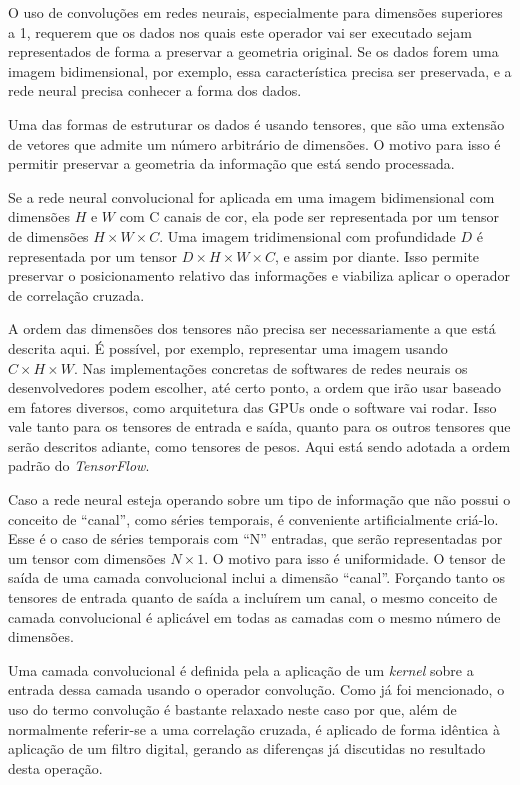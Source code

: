 O uso de convoluções em redes neurais, especialmente para dimensões superiores
a 1, requerem que os dados nos quais este operador vai ser executado sejam
representados de forma a preservar a geometria original. Se os dados forem uma
imagem bidimensional, por exemplo, essa característica precisa ser preservada,
e a rede neural precisa conhecer a forma dos dados.

Uma das formas de estruturar os dados é usando tensores, que são uma
extensão de
vetores que admite um número arbitrário de dimensões. O motivo para isso é
permitir preservar a geometria da informação que está sendo processada.

Se a rede neural convolucional for aplicada em uma
imagem bidimensional com dimensões $H$ e $W$ com C canais de cor, ela pode ser
representada por um tensor de dimensões $H \times W \times C$. Uma imagem
tridimensional com profundidade $D$ é representada por um tensor
$D \times H \times W \times C$, e assim por
diante. Isso permite preservar o posicionamento relativo das informações
e viabiliza aplicar o operador de correlação cruzada.

A ordem das dimensões dos tensores não precisa ser necessariamente a que está
descrita aqui. É possível, por exemplo, representar uma imagem usando $C \times
H \times W$.
Nas implementações concretas de softwares de redes neurais os
desenvolvedores podem escolher, até certo ponto, a ordem que irão usar baseado
em fatores diversos, como arquitetura das GPUs onde o software vai rodar.
Isso vale tanto para os tensores de entrada e saída, quanto para os outros
tensores que serão descritos adiante, como tensores de pesos. Aqui
está sendo adotada a ordem padrão do \emph{TensorFlow}.

Caso a rede neural esteja operando sobre um tipo de informação que não possui o
conceito de “canal”, como séries temporais, é conveniente artificialmente
criá-lo. Esse é o caso de séries temporais com “N” entradas, que serão
representadas por um tensor com dimensões $N\times1$. O motivo para isso é
uniformidade. O tensor de saída de uma camada convolucional inclui a dimensão
“canal”. Forçando tanto os tensores de entrada quanto de saída a incluírem um
canal, o mesmo conceito de camada convolucional é aplicável em todas as camadas
com o mesmo número de dimensões.

Uma camada convolucional é definida pela a aplicação de um \emph{kernel} sobre
a entrada dessa camada usando o operador convolução. Como já foi mencionado,
o uso do termo convolução
é bastante relaxado neste caso por que, além de normalmente referir-se a
uma correlação cruzada, é aplicado de forma idêntica à aplicação de um filtro
digital, gerando as diferenças já discutidas no resultado desta operação.


